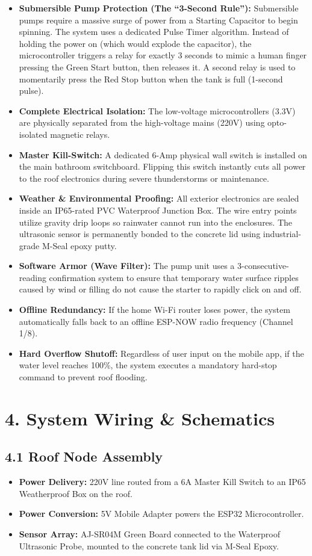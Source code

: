 \documentclass[11pt, a4paper]{article}
\begin{document}
\begin{itemize}
    \item \textbf{Submersible Pump Protection (The ``3-Second Rule''):} Submersible pumps require a massive surge of power from a Starting Capacitor to begin spinning. The system uses a dedicated Pulse Timer algorithm. Instead of holding the power on (which would explode the capacitor), the microcontroller triggers a relay for exactly 3 seconds to mimic a human finger pressing the Green Start button, then releases it. A second relay is used to momentarily press the Red Stop button when the tank is full (1-second pulse).
    \item \textbf{Complete Electrical Isolation:} The low-voltage microcontrollers (3.3V) are physically separated from the high-voltage mains (220V) using opto-isolated magnetic relays.
    \item \textbf{Master Kill-Switch:} A dedicated 6-Amp physical wall switch is installed on the main bathroom switchboard. Flipping this switch instantly cuts all power to the roof electronics during severe thunderstorms or maintenance.
    \item \textbf{Weather \& Environmental Proofing:} All exterior electronics are sealed inside an IP65-rated PVC Waterproof Junction Box. The wire entry points utilize gravity drip loops so rainwater cannot run into the enclosures. The ultrasonic sensor is permanently bonded to the concrete lid using industrial-grade M-Seal epoxy putty.
    \item \textbf{Software Armor (Wave Filter):} The pump unit uses a 3-consecutive-reading confirmation system to ensure that temporary water surface ripples caused by wind or filling do not cause the starter to rapidly click on and off.
    \item \textbf{Offline Redundancy:} If the home Wi-Fi router loses power, the system automatically falls back to an offline ESP-NOW radio frequency (Channel 1/8).
    \item \textbf{Hard Overflow Shutoff:} Regardless of user input on the mobile app, if the water level reaches 100\%, the system executes a mandatory hard-stop command to prevent roof flooding.
\end{itemize}

\section*{4. System Wiring \& Schematics}

\subsection*{4.1 Roof Node Assembly}
\begin{itemize}
    \item \textbf{Power Delivery:} 220V line routed from a 6A Master Kill Switch to an IP65 Weatherproof Box on the roof.
    \item \textbf{Power Conversion:} 5V Mobile Adapter powers the ESP32 Microcontroller.
    \item \textbf{Sensor Array:} AJ-SR04M Green Board connected to the Waterproof Ultrasonic Probe, mounted to the concrete tank lid via M-Seal Epoxy.
\end{itemize}
\end{document}
